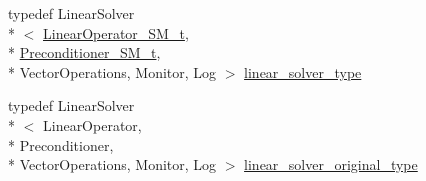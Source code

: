 \begin{DoxyCompactItemize}
\item 
typedef Linear\-Solver\\*
$<$ \hyperlink{classnumerical__algos_1_1sherman__morrison__linear__system_1_1sherman__morrison__linear__system__solve_a27aa5b8ed7e0d3bf53d48698f32aea16}{Linear\-Operator\-\_\-\-S\-M\-\_\-t}, \\*
\hyperlink{classnumerical__algos_1_1sherman__morrison__linear__system_1_1sherman__morrison__linear__system__solve_a93a7b771196ea179d7c5cfc6e4f55ca4}{Preconditioner\-\_\-\-S\-M\-\_\-t}, \\*
Vector\-Operations, Monitor, Log $>$ \hyperlink{classnumerical__algos_1_1sherman__morrison__linear__system_1_1sherman__morrison__linear__system__solve_a0a05cc7927e440224dfdef6aeb93e4b7}{linear\-\_\-solver\-\_\-type}
\item 
typedef Linear\-Solver\\*
$<$ Linear\-Operator, \\*
Preconditioner, \\*
Vector\-Operations, Monitor, Log $>$ \hyperlink{classnumerical__algos_1_1sherman__morrison__linear__system_1_1sherman__morrison__linear__system__solve_a863956a47581f9793061f860e0720b24}{linear\-\_\-solver\-\_\-original\-\_\-type}
\end{DoxyCompactItemize}
